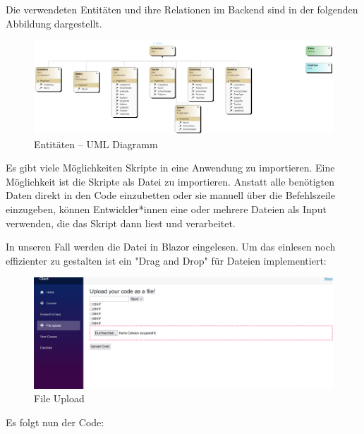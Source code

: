 \newpage

Die verwendeten Entitäten und ihre Relationen im Backend sind in der folgenden Abbildung dargestellt.

\begin{figure}[H]
    \centering
    \includegraphics[scale=0.5]{pics/EntitiesClassDiagram.png}
    \caption{Entitäten -- UML Diagramm}
    \label{fig:impl:Entities}
\end{figure}




\newpage
Es gibt viele Möglichkeiten Skripte in eine Anwendung zu importieren.
Eine Möglichkeit ist die Skripte als Datei zu importieren.
Anstatt alle benötigten Daten direkt in den Code einzubetten oder sie manuell über die Befehlszeile einzugeben, 
können Entwickler*innen eine oder mehrere Dateien als Input verwenden, die das Skript dann liest und verarbeitet.

In unseren Fall werden die Datei in Blazor eingelesen.
Um das einlesen noch effizienter zu gestalten ist ein "Drag and Drop" für Dateien implementiert:

\begin{figure}[H]
    \centering
    \includegraphics[scale=0.5]{pics/FileUpload.png}
    \caption{File Upload}
    \label{fig:impl:fileupload}
\end{figure}

Es folgt nun der Code:

